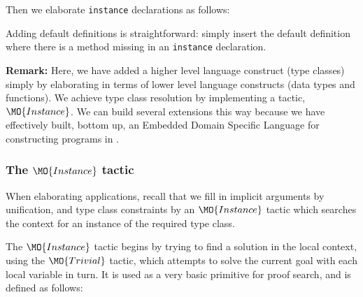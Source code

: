 \noindent
Then we elaborate \texttt{instance} declarations as follows:


Adding default definitions is straightforward: simply insert the default definition where
there is a method missing in an \texttt{instance} declaration.

\textbf{Remark:} Here, we have added a higher level language construct (type
classes) simply by elaborating in terms of lower level language constructs
(data types and functions).  We achieve type class resolution by implementing a
tactic, $\MO{Instance}$.  We can build several extensions this way because we
have effectively built, bottom up, an Embedded Domain Specific Language for
constructing programs in \TT{}.

\subsubsection{The $\MO{Instance}$ tactic}

\label{sect:instance}

When elaborating applications, recall that we fill in implicit arguments by
unification, and type class constraints by an $\MO{Instance}$ tactic which searches
the context for an instance of the required type class. 

The $\MO{Instance}$ tactic begins by trying to find a solution in the local context,
using the $\MO{Trivial}$ tactic, which attempts
to solve the current goal with each local variable in turn. It is used as a very
basic primitive for proof search, and is defined as follows:



